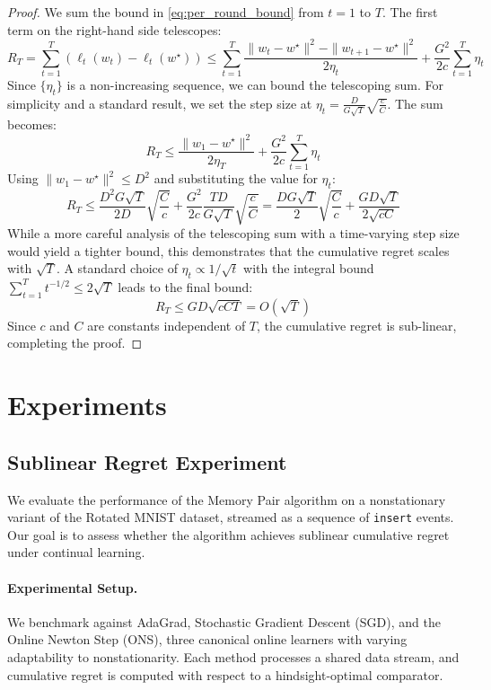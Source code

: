 \documentclass[a4paper,12pt]{article}
\begin{document}
\begin{proof}
We sum the bound in \eqref{eq:per_round_bound} from $t=1$ to $T$. The first term on the right-hand side telescopes:
$$
R_T = \sum_{t=1}^T (\ell_t(w_t) - \ell_t(w^\star)) \le \sum_{t=1}^T \frac{\|w_t - w^\star\|^2 - \|w_{t+1} - w^\star\|^2}{2\eta_t} + \frac{G^2}{2c}\sum_{t=1}^T \eta_t
$$
Since $\{\eta_t\}$ is a non-increasing sequence, we can bound the telescoping sum. For simplicity and a standard result, we set the step size at $\eta_t = \frac{D}{G\sqrt{T}}\sqrt{\frac{c}{C}}$. The sum becomes:
$$
R_T \le \frac{\|w_1 - w^\star\|^2}{2\eta_T} + \frac{G^2}{2c}\sum_{t=1}^T \eta_t
$$
Using $\|w_1 - w^\star\|^2 \le D^2$ and substituting the value for $\eta_t$:
$$
R_T \le \frac{D^2 G \sqrt{T}}{2D}\sqrt{\frac{C}{c}} + \frac{G^2}{2c} \frac{TD}{G\sqrt{T}}\sqrt{\frac{c}{C}} = \frac{DG\sqrt{T}}{2}\sqrt{\frac{C}{c}} + \frac{GD\sqrt{T}}{2\sqrt{c C}}
$$
While a more careful analysis of the telescoping sum with a time-varying step size would yield a tighter bound, this demonstrates that the cumulative regret scales with $\sqrt{T}$. A standard choice of $\eta_t \propto 1/\sqrt{t}$ with the integral bound $\sum_{t=1}^T t^{-1/2} \le 2\sqrt{T}$ leads to the final bound:
$$
R_T \le GD\sqrt{cCT} = O(\sqrt{T})
$$
Since $c$ and $C$ are constants independent of $T$, the cumulative regret is sub-linear, completing the proof.
\end{proof}
\section{Experiments}
\subsection{Sublinear Regret Experiment}

We evaluate the performance of the Memory Pair algorithm on a nonstationary variant of the Rotated MNIST dataset, streamed as a sequence of \texttt{insert} events. Our goal is to assess whether the algorithm achieves sublinear cumulative regret under continual learning.

\paragraph{Experimental Setup.} We benchmark against AdaGrad, Stochastic Gradient Descent (SGD), and the Online Newton Step (ONS), three canonical online learners with varying adaptability to nonstationarity. Each method processes a shared data stream, and cumulative regret is computed with respect to a hindsight-optimal comparator.
\end{document}
